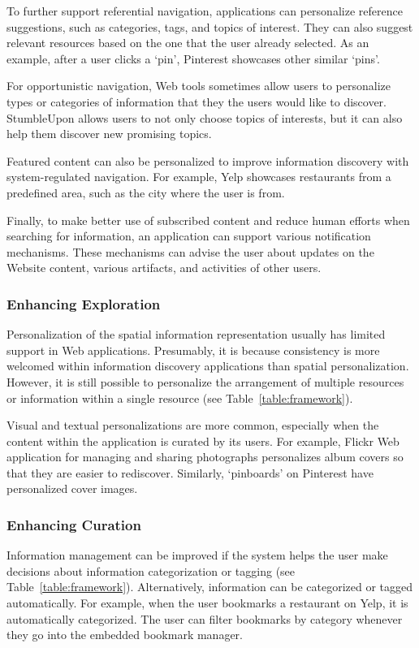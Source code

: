 \documentclass{sigchi}
\newcommand{\feature}[1]{{\ttfamily#1}}
\begin{document}
{{{To further support referential navigation, applications can \feature{personalize} reference suggestions, such as \feature{categories}, \feature{tags}, and \feature{topics} of interest. They can also suggest relevant resources based on the one that the user already selected. As an example, after a user clicks a `pin', Pinterest showcases other similar `pins'.

For opportunistic navigation, Web tools sometimes allow users to \feature{personalize} types or categories of information that they the users would like to discover. StumbleUpon allows users to not only choose topics of interests, but it can also help them discover new promising topics.


Featured content can also be \feature{personalized} to improve information discovery with system-regulated navigation. For example, Yelp showcases restaurants from a predefined area, such as the city where the user is from.

Finally, to make better use of subscribed content and reduce human efforts when searching for information, an application can support various \feature{notification mechanisms}. These mechanisms can advise the user about updates on the \feature{Website content}, various \feature{artifacts}, and activities of other \feature{users}.  

} %
{\subsubsection{Enhancing Exploration}
\feature{Personalization} of the \feature{spatial} information representation usually has limited support in Web applications. Presumably, it is because consistency is more welcomed within information discovery applications than spatial personalization. However, it is still possible to personalize the arrangement of multiple resources or information within a single resource (see Table~\ref{table:framework}). 

\feature{Visual} and \feature{textual personalizations} are more common, especially when the content within the application is curated by its users.  For example, Flickr Web application for managing and sharing photographs personalizes album covers so that they are easier to rediscover. Similarly, `pinboards' on Pinterest have personalized cover images.



{\subsubsection{Enhancing Curation}
Information management can be improved if the system helps the user make decisions about information categorization or tagging (see Table~\ref{table:framework}). Alternatively, information can be \feature{categorized} or \feature{tagged automatically}. For example, when the user bookmarks a restaurant on Yelp, it is automatically categorized. The user can filter bookmarks by category whenever they go into the embedded bookmark manager. 

}}}}
\end{document}
